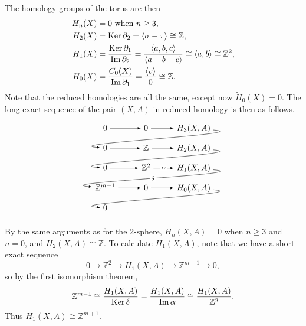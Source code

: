 \documentclass[twoside,10pt]{article}
\begin{document}
\begin{enumerate}
The homology groups of the torus are then
\begin{align*}
	H_{n}(X) &= 0 \text{ when } n \geq 3,\\
	H_2(X) &= \operatorname{Ker} \partial_2 = \langle \sigma - \tau \rangle\cong \mathbb{Z},\\
	H_1(X) &= \frac{\operatorname{Ker} \partial_1}{\operatorname{Im} \partial_2} = \frac{\langle a,b,c \rangle}{\langle a+b-c \rangle} \cong \langle a,b \rangle\cong \mathbb{Z}^{2},\\
	H_0(X) &= \frac{C_0(X)}{\operatorname{Im} \partial_1} = \frac{\langle v \rangle}{0} \cong \mathbb{Z}.
\end{align*}
Note that the reduced homologies are all the same, except now $\tilde{H}_0(X) = 0$. The long exact sequence of the pair $(X,A)$ in reduced homology is then as follows.
		\[
                \begin{tikzpicture}[descr/.style={fill=white,inner sep=1.5pt}]
                        \matrix (m) [                            matrix of math nodes,
                            row sep=1em,
                            column sep=2.5em,
                            text height=1.5ex, text depth=0.25ex
                        ]
                        {
                                0 & 0 & H_{3}(X,A) \\
                                0 & \mathbb{Z} & H_{2}(X,A) \\
                                0 & \mathbb{Z}^{2} & H_{1}(X,A) \\
                                \mathbb{Z}^{m-1} & 0 & H_{0}(X,A) \\
                                0 \\
                        };
                        \path[overlay,->, font=\scriptsize,>=latex]
                        (m-1-1) edge (m-1-2)
                        (m-1-2) edge (m-1-3)
                        (m-1-3) edge[out=355,in=175] (m-2-1)
                        (m-2-1) edge (m-2-2)
                        (m-2-2) edge (m-2-3)
                        (m-2-3) edge[out=355,in=175] (m-3-1)
                        (m-3-1) edge (m-3-2)
			(m-3-2) edge node[descr]{$\alpha$} (m-3-3)
			(m-3-3) edge[out=355,in=175] node[descr]{$\delta$} (m-4-1)
                        (m-4-1) edge (m-4-2)
                        (m-4-2) edge (m-4-3)
                        (m-4-3) edge[out=355,in=175] (m-5-1);
                \end{tikzpicture}
                \]
		By the same arguments as for the 2-sphere, $H_{n}(X,A) = 0$ when $n \geq 3$ and $n=0$, and $H_{2}(X,A) \cong \mathbb{Z}$. To calculate $H_1(X,A)$, note that we have a short exact sequence
		\[
			0 \to \mathbb{Z}^{2} \to H_1(X,A) \to \mathbb{Z}^{m-1}\to 0,
		\] so by the first isomorphism theorem,
		\[
			\mathbb{Z}^{m-1} \cong \frac{H_1(X,A)}{\operatorname{Ker} \delta} = \frac{H_1(X,A)}{\operatorname{Im} \alpha} \cong \frac{H_1(X,A)}{\mathbb{Z}^{2}} .
		\] Thus $H_1(X,A) \cong \mathbb{Z}^{m+1}$.


\end{enumerate}
\end{document}
